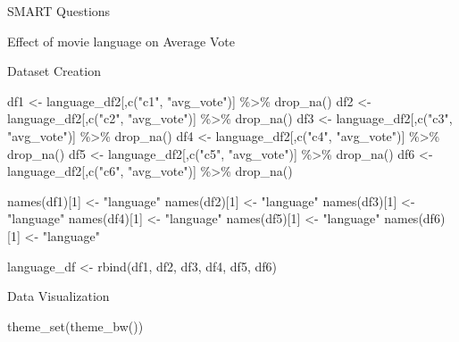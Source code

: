 \documentclass[
  ignorenonframetext,
]{beamer}
\newenvironment{Shaded}{\begin{snugshade}}{\end{snugshade}}
\newcommand{\DecValTok}[1]{\textcolor[rgb]{0.00,0.00,0.81}{#1}}
\newcommand{\FunctionTok}[1]{\textcolor[rgb]{0.00,0.00,0.00}{#1}}
\newcommand{\NormalTok}[1]{#1}
\newcommand{\OtherTok}[1]{\textcolor[rgb]{0.56,0.35,0.01}{#1}}
\newcommand{\SpecialCharTok}[1]{\textcolor[rgb]{0.00,0.00,0.00}{#1}}
\newcommand{\StringTok}[1]{\textcolor[rgb]{0.31,0.60,0.02}{#1}}
\begin{document}
\begin{frame}[fragile]{SMART Questions}
\begin{block}{Effect of movie language on Average Vote}
\begin{block}{Dataset Creation}
\begin{Shaded}
\begin{Highlighting}[]
\NormalTok{df1 }\OtherTok{\textless{}{-}}\NormalTok{ language\_df2[,}\FunctionTok{c}\NormalTok{(}\StringTok{"c1"}\NormalTok{, }\StringTok{"avg\_vote"}\NormalTok{)] }\SpecialCharTok{\%\textgreater{}\%} \FunctionTok{drop\_na}\NormalTok{()}
\NormalTok{df2 }\OtherTok{\textless{}{-}}\NormalTok{ language\_df2[,}\FunctionTok{c}\NormalTok{(}\StringTok{"c2"}\NormalTok{, }\StringTok{"avg\_vote"}\NormalTok{)] }\SpecialCharTok{\%\textgreater{}\%} \FunctionTok{drop\_na}\NormalTok{()}
\NormalTok{df3 }\OtherTok{\textless{}{-}}\NormalTok{ language\_df2[,}\FunctionTok{c}\NormalTok{(}\StringTok{"c3"}\NormalTok{, }\StringTok{"avg\_vote"}\NormalTok{)] }\SpecialCharTok{\%\textgreater{}\%} \FunctionTok{drop\_na}\NormalTok{()}
\NormalTok{df4 }\OtherTok{\textless{}{-}}\NormalTok{ language\_df2[,}\FunctionTok{c}\NormalTok{(}\StringTok{"c4"}\NormalTok{, }\StringTok{"avg\_vote"}\NormalTok{)] }\SpecialCharTok{\%\textgreater{}\%} \FunctionTok{drop\_na}\NormalTok{()}
\NormalTok{df5 }\OtherTok{\textless{}{-}}\NormalTok{ language\_df2[,}\FunctionTok{c}\NormalTok{(}\StringTok{"c5"}\NormalTok{, }\StringTok{"avg\_vote"}\NormalTok{)] }\SpecialCharTok{\%\textgreater{}\%} \FunctionTok{drop\_na}\NormalTok{()}
\NormalTok{df6 }\OtherTok{\textless{}{-}}\NormalTok{ language\_df2[,}\FunctionTok{c}\NormalTok{(}\StringTok{"c6"}\NormalTok{, }\StringTok{"avg\_vote"}\NormalTok{)] }\SpecialCharTok{\%\textgreater{}\%} \FunctionTok{drop\_na}\NormalTok{()}

\FunctionTok{names}\NormalTok{(df1)[}\DecValTok{1}\NormalTok{] }\OtherTok{\textless{}{-}} \StringTok{"language"}
\FunctionTok{names}\NormalTok{(df2)[}\DecValTok{1}\NormalTok{] }\OtherTok{\textless{}{-}} \StringTok{"language"}
\FunctionTok{names}\NormalTok{(df3)[}\DecValTok{1}\NormalTok{] }\OtherTok{\textless{}{-}} \StringTok{"language"}
\FunctionTok{names}\NormalTok{(df4)[}\DecValTok{1}\NormalTok{] }\OtherTok{\textless{}{-}} \StringTok{"language"}
\FunctionTok{names}\NormalTok{(df5)[}\DecValTok{1}\NormalTok{] }\OtherTok{\textless{}{-}} \StringTok{"language"}
\FunctionTok{names}\NormalTok{(df6)[}\DecValTok{1}\NormalTok{] }\OtherTok{\textless{}{-}} \StringTok{"language"}

\NormalTok{language\_df }\OtherTok{\textless{}{-}} \FunctionTok{rbind}\NormalTok{(df1, df2, df3, df4, df5, df6)}
\end{Highlighting}
\end{Shaded}
\end{block}

\begin{block}{Data Visualization}
\protect\hypertarget{data-visualization-2}{}
\begin{Shaded}
\begin{Highlighting}[]
\FunctionTok{theme\_set}\NormalTok{(}\FunctionTok{theme\_bw}\NormalTok{())}


\end{Highlighting}
\end{Shaded}
\end{block}
\end{block}
\end{frame}
\end{document}

